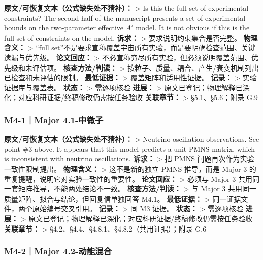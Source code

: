 \documentclass[
]{article}
\begin{document}
\textbf{原文/可恢复文本（公式缺失处不猜补）：} \textgreater{} Is this
the full set of experimental constraints? The second half of the
manuscript presents a set of experimental bounds on the two-parameter
effective \(A'\) model. It is not obvious if this is the full set of
constraints on the model. \textbf{诉求：} \textgreater{}
要求说明约束集合是否完整。 \textbf{物理含义：} \textgreater{} ``full
set''不是要求宣称覆盖宇宙所有实验，而是要明确检查范围、关键遗漏与优先级。
\textbf{论文回应：} \textgreater{}
不必宣称穷尽所有实验，但必须说明覆盖范围、优先级和未评估项。
\textbf{核查方法/判读：} \textgreater{}
按粒子、质量、耦合、产生/衰变机制列出已检查和未评估的限制。
\textbf{最低证据：} \textgreater{} 覆盖矩阵和适用性证据。
\textbf{记录：} \textgreater{} 实验证据库与覆盖表。 \textbf{状态：}
\textgreater{} 需逐项核验 \textbf{进展：} \textgreater{}
原文已登记；物理解释已深化；对应科研证据/终稿修改仍需按任务验收
\textbf{关联章节：} \textgreater{} §5.1、§5.6；附录 G.9

\subsubsection{M4-1｜Major
4.1-中微子}\label{m4-1major-4.1-ux4e2dux5faeux5b50}

\textbf{原文/可恢复文本（公式缺失处不猜补）：} \textgreater{} Neutrino
oscillation observations. See point \#3 above. It appears that this
model predicts a unit PMNS matrix, which is inconsistent with neutrino
oscillations. \textbf{诉求：} \textgreater{} 把 PMNS
问题再次作为实验一致性限制提出。 \textbf{物理含义：} \textgreater{}
这不是新的独立 PMNS 推导，而是 Major 3
的重复提醒，说明它对实验一致性的重要性。 \textbf{论文回应：}
\textgreater{} 必须与 Major 3 共用同一套矩阵推导，不能两处结论不一致。
\textbf{核查方法/判读：} \textgreater{} 与 Major 3
共用同一质量矩阵、拟合与结论，但回复信单独回答 M4.1。
\textbf{最低证据：} \textgreater{} 同一证据文件，两个原始编号交叉引用。
\textbf{记录：} \textgreater{} 同 M3 证据。 \textbf{状态：}
\textgreater{} 需逐项核验 \textbf{进展：} \textgreater{}
原文已登记；物理解释已深化；对应科研证据/终稿修改仍需按任务验收
\textbf{关联章节：} \textgreater{}
§4.2、§4.4、§4.8.1、§4.8.2（共用证据）；附录 G.6

\subsubsection{M4-2｜Major
4.2-动能混合}\label{m4-2major-4.2-ux52a8ux80fdux6df7ux5408}
\end{document}
